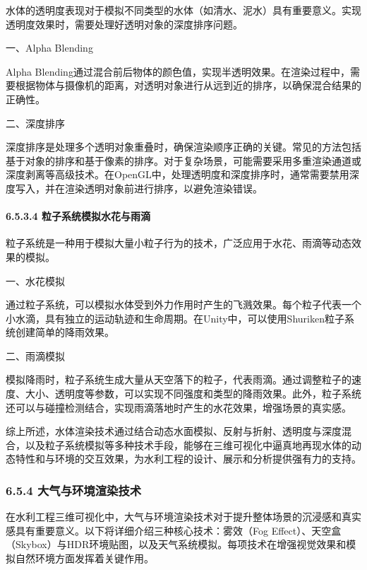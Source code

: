水体的透明度表现对于模拟不同类型的水体（如清水、泥水）具有重要意义。实现透明度效果时，需要处理好透明对象的深度排序问题。

一、Alpha Blending

Alpha Blending通过混合前后物体的颜色值，实现半透明效果。在渲染过程中，需要根据物体与摄像机的距离，对透明对象进行从远到近的排序，以确保混合结果的正确性。

二、深度排序

深度排序是处理多个透明对象重叠时，确保渲染顺序正确的关键。常见的方法包括基于对象的排序和基于像素的排序。对于复杂场景，可能需要采用多重渲染通道或深度剥离等高级技术。在OpenGL中，处理透明度和深度排序时，通常需要禁用深度写入，并在渲染透明对象前进行排序，以避免渲染错误。

\hypertarget{ux7c92ux5b50ux7cfbux7edfux6a21ux62dfux6c34ux82b1ux4e0eux96e8ux6ef4}{%
\paragraph{6.5.3.4 粒子系统模拟水花与雨滴}\label{ux7c92ux5b50ux7cfbux7edfux6a21ux62dfux6c34ux82b1ux4e0eux96e8ux6ef4}}

粒子系统是一种用于模拟大量小粒子行为的技术，广泛应用于水花、雨滴等动态效果的模拟。

一、水花模拟

通过粒子系统，可以模拟水体受到外力作用时产生的飞溅效果。每个粒子代表一个小水滴，具有独立的运动轨迹和生命周期。在Unity中，可以使用Shuriken粒子系统创建简单的降雨效果。

二、雨滴模拟

模拟降雨时，粒子系统生成大量从天空落下的粒子，代表雨滴。通过调整粒子的速度、大小、透明度等参数，可以实现不同强度和类型的降雨效果。此外，粒子系统还可以与碰撞检测结合，实现雨滴落地时产生的水花效果，增强场景的真实感。

综上所述，水体渲染技术通过结合动态水面模拟、反射与折射、透明度与深度混合，以及粒子系统模拟等多种技术手段，能够在三维可视化中逼真地再现水体的动态特性和与环境的交互效果，为水利工程的设计、展示和分析提供强有力的支持。

\hypertarget{ux5927ux6c14ux4e0eux73afux5883ux6e32ux67d3ux6280ux672f}{%
\subsubsection{6.5.4 大气与环境渲染技术}\label{ux5927ux6c14ux4e0eux73afux5883ux6e32ux67d3ux6280ux672f}}

在水利工程三维可视化中，大气与环境渲染技术对于提升整体场景的沉浸感和真实感具有重要意义。以下将详细介绍三种核心技术：雾效（Fog Effect）、天空盒（Skybox）与HDR环境贴图，以及天气系统模拟。每项技术在增强视觉效果和模拟自然环境方面发挥着关键作用。

